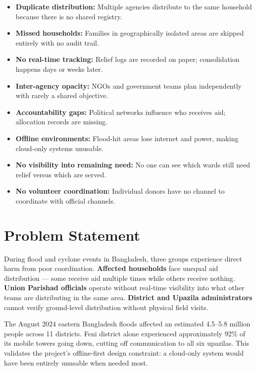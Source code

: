 \begin{itemize}[leftmargin=1.2cm]
    \item \textbf{Duplicate distribution:} Multiple agencies distribute to the same household because there is no shared registry.
    \item \textbf{Missed households:} Families in geographically isolated areas are skipped entirely with no audit trail.
    \item \textbf{No real-time tracking:} Relief logs are recorded on paper; consolidation happens days or weeks later.
    \item \textbf{Inter-agency opacity:} NGOs and government teams plan independently with rarely a shared objective.
    \item \textbf{Accountability gaps:} Political networks influence who receives aid; allocation records are missing.
    \item \textbf{Offline environments:} Flood-hit areas lose internet and power, making cloud-only systems unusable.
    \item \textbf{No visibility into remaining need:} No one can see which wards still need relief versus which are served.
    \item \textbf{No volunteer coordination:} Individual donors have no channel to coordinate with official channels.
\end{itemize}

\section{Problem Statement}

During flood and cyclone events in Bangladesh, three groups experience direct harm from poor coordination. \textbf{Affected households} face unequal aid distribution --- some receive aid multiple times while others receive nothing. \textbf{Union Parishad officials} operate without real-time visibility into what other teams are distributing in the same area. \textbf{District and Upazila administrators} cannot verify ground-level distribution without physical field visits.

The August 2024 eastern Bangladesh floods affected an estimated 4.5--5.8 million people across 11 districts. Feni district alone experienced approximately 92\% of its mobile towers going down, cutting off communication to all six upazilas. This validates the project's offline-first design constraint: a cloud-only system would have been entirely unusable when needed most.

